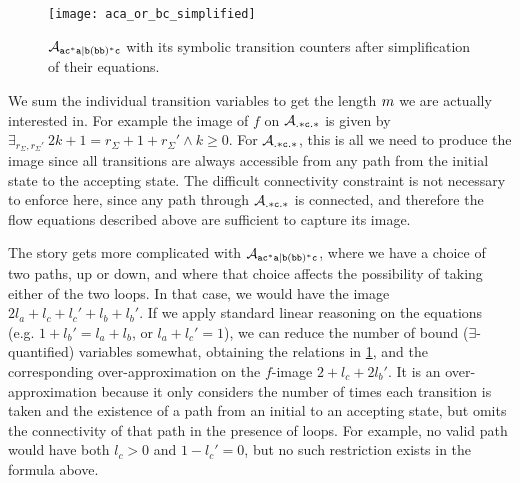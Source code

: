 \documentclass[acmsmall,review,anonymous,screen]{acmart}\settopmatter{printfolios=true,printccs=false,printacmref=true}
\theoremstyle{definition}
\begin{document}
\begin{figure}[t]
  \centering 
    \texttt{[image: aca\_or\_bc\_simplified]}
    \caption{$\mathcal{A}_{\mathtt{ac^*a|b(bb)^*c}}{}$ with its symbolic transition counters after
    simplification of their equations.}\label{fig:example-simplify-1}
  \end{figure}

We sum the individual transition variables to get the length $m$ we
are actually interested in. For example the image of $f$ on
$\mathcal{A}_{\mathtt{.*c.*}}$ is given by $\exists_{r_\Sigma, r_\Sigma'} \: 2k + 1 =
r_\Sigma + 1 + r_\Sigma' \land k \geq 0$. For $\mathcal{A}_{\mathtt{.*c.*}}{}$, this is
all we need to produce the image since all transitions are always accessible
from any path from the initial state to the accepting state. The difficult
connectivity constraint is not necessary to enforce here, since any path through
$\mathcal{A}_{\mathtt{.*c.*}}{}$ is connected, and therefore the flow equations
described above are sufficient to capture its image.

The story gets more complicated with $\mathcal{A}_{\mathtt{ac^*a|b(bb)^*c}}{}$, where we have a choice of two
paths, up or down, and where that choice affects the possibility of taking
either of the two loops. In that case, we would have the image $2l_a + l_c + l_c' + l_b + l_b'$.
If we apply standard linear reasoning on the equations (e.g. $1 + {l_b}' = l_a +
l_b$, or $l_a + l_c' = 1$), we can reduce the number of bound
($\exists$-quantified) variables somewhat, obtaining the relations in
\cref{fig:example-simplify-1}, and the corresponding over-approximation on
the $f$-image $2 + l_c + 2l_b'$. It is an over-approximation because it only
considers the number of times each transition is taken and the existence of a
path from an initial to an accepting state, but omits the connectivity of that
path in the presence of loops. For example, no valid path would have both $l_c >
0$ and $1 - l_c' = 0$, but no such restriction exists in the formula above.
\end{document}
